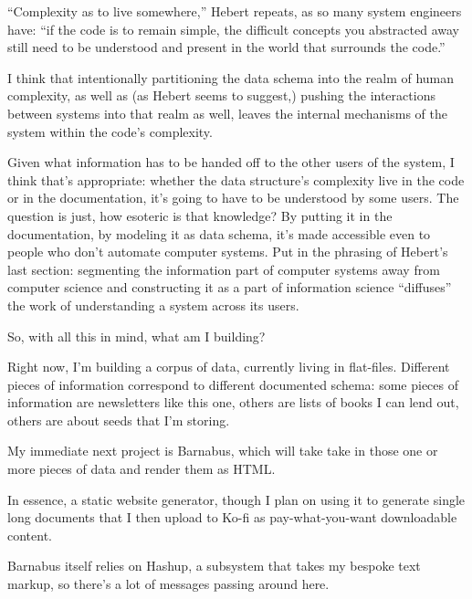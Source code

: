 \documentclass[11pt]{article}
\begin{document}
\begin{itemize}
“Complexity as to live somewhere,” Hebert repeats, as so many system engineers have: “if the code is to remain simple, the difficult concepts you abstracted away still need to be understood and present in the world that surrounds the code.”

I think that intentionally partitioning the data schema into the realm of human complexity, as well as (as Hebert seems to suggest,) pushing the interactions between systems into that realm as well, leaves the internal mechanisms of the system within the code’s complexity.

Given what information has to be handed off to the other users of the system, I think that’s appropriate: whether the data structure’s complexity live in the code or in the documentation, it’s going to have to be understood by some users. The question is just, how esoteric is that knowledge? By putting it in the documentation, by modeling it as data schema, it’s made accessible even to people who don’t automate computer systems. Put in the phrasing of Hebert’s last section: segmenting the information part of computer systems away from computer science and constructing it as a part of information science “diffuses” the work of understanding a system across its users.

So, with all this in mind, what am I building?

Right now, I’m building a corpus of data, currently living in flat-files. Different pieces of information correspond to different documented schema: some pieces of information are newsletters like this one, others are lists of books I can lend out, others are about seeds that I’m storing.

My immediate next project is Barnabus, which will take take in those one or more pieces of data and render them as HTML.

In essence, a static website generator, though I plan on using it to generate single long documents that I then upload to Ko-fi as pay-what-you-want downloadable content.

Barnabus itself relies on Hashup, a subsystem that takes my bespoke text markup, so there’s a lot of messages passing around here.
\end{itemize}
\stopcontents[level-4]
\end{document}
